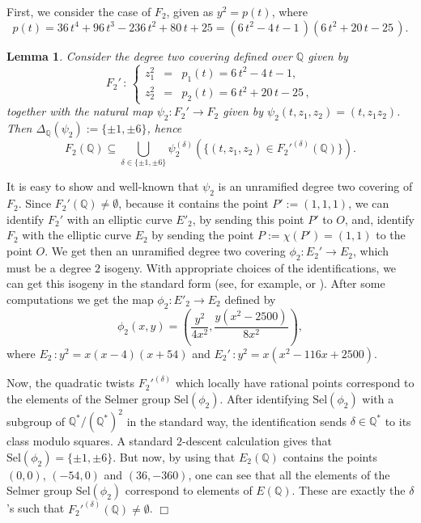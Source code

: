 \documentclass[a4paper,12pt]{amsart}
\newtheorem{lem}[thm]{Lemma}
\theoremstyle{remark}
\theoremstyle{definition}
\newenvironment{pf}{\par\noindent{\bf Proof.}\enspace\ignorespaces}{{\hfill $\Box$}\par\par}
\begin{document}
First, we consider the case of $F_2$, given as $y^2=p(t)$, where
$$p(t)=36\,t^4 + 96\,t^3 - 236\,t^2 + 80\,t +
25=(6\,t^2-4\,t-1\,)(6\,t^2+20\,t-25\,).$$

\begin{lem}\label{deltaF2}
Consider the degree two covering defined over ${{\mathbb{Q}}}$ given by
$$
F_2'\,:\, \left\{
\begin{array}{rcl}
z_1^2&\!\!\!=&\!\!\!  p_1(t)=6\,t^2-4\,t-1,   \\[1mm]
z_2^2 &\!\!\! =&\!\!\!   p_2(t)= 6\,t^2+20\,t-25\,,
\end{array}\right.
$$
together with the natural map $\psi_2:F_2'\to F_2$ given by
$\psi_2(t,z_1,z_2)=(t,z_1z_2)$. Then $\Delta_{{\mathbb{Q}}}(\psi_2):=\{ \pm
1,\pm 6 \}$, hence
$$F_2({{\mathbb{Q}}}) \subseteq \bigcup_{\delta \in \{\pm 1, \pm 6 \}}
\psi_2^{(\delta)}(\{(t,z_1,z_2)\in F_2'^{(\delta)}({{\mathbb{Q}}})\}).$$
\end{lem}

\begin{pf} It is easy to show and well-known that $\psi_2$ is an
unramified degree two covering of $F_2$. Since $F_2'({{\mathbb{Q}}})\ne
\emptyset$, because it contains the point $P':=(1,1,1)$, we can
identify $F_2'$ with an elliptic curve $E'_2$, by sending this
point $P'$ to $O$, and, identify $F_2$ with the elliptic curve
$E_2$ by sending the point $P:=\chi(P')=(1,1)$ to the point $O$.
We get then an unramified degree two covering $\phi_2:E_2'\to
E_2$, which must be a degree $2$ isogeny. With appropriate choices
of the identifications, we can get this isogeny in the standard
form (see, for example, \cite[III.4.5]{Sil} or \cite[\S 8.2]{Coh}
). After some computations we get the map $\phi_2 : E'_2 \to E_2$
defined by
$$
\phi_2(x,y)=\left(\frac{y^2}{4x^2},\frac{y(x^2-2500)}{8x^2}\right),
$$
where $E_2\,:y^2 =  x(x-4)(x+54)$ and $E_2'\,: y^2=x(x^2 - 116x +
2500)$.

Now, the quadratic twists $F_2'^{(\delta)}$ which locally have
rational points correspond to the elements of the Selmer group
$\mbox{Sel}(\phi_2)$. After identifying $\mbox{Sel}(\phi_2)$ with
a subgroup of ${{\mathbb{Q}}}^*/({{\mathbb{Q}}}^*)^2$ in the standard way, the
identification sends $\delta\in {{\mathbb{Q}}}^*$ to its class modulo
squares. A standard $2$-descent calculation gives that
$\mbox{Sel}(\phi_2)=\{ \pm 1, \pm 6 \}$. But now, by using that
 $E_2({{\mathbb{Q}}})$ contains the points $(0,0)$, $(-54, 0)$ and $(36,
 -360)$, one can see that
 all the elements of the Selmer group $\mbox{Sel}(\phi_2)$ correspond
 to elements of $E({{\mathbb{Q}}})$. These are exactly the $\delta$'s
 such that $F_2'^{(\delta)}({{\mathbb{Q}}})\ne \emptyset$.
\end{pf}
\end{document}
